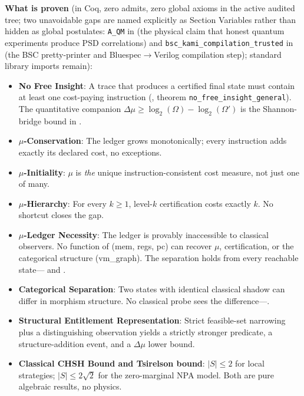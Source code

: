 \documentclass[9pt, a4paper, oneside, twocolumn]{extreport}
\theoremstyle{plain}
\theoremstyle{definition}
\theoremstyle{remark}
\begin{document}
\textbf{What is proven} (in Coq, zero admits, zero global axioms in the active audited tree; two unavoidable gaps are named explicitly as Section Variables rather than hidden as global postulates: \texttt{A\_QM} in  (the physical claim that honest quantum experiments produce PSD correlations) and \texttt{bsc\_kami\_compilation\_trusted} in  (the BSC pretty-printer and Bluespec$\to$Verilog compilation step); standard library imports remain):
\begin{itemize}
    \item \textbf{No Free Insight}: A trace that produces a certified final state must contain at least one cost-paying instruction (, theorem \texttt{no\_free\_insight\_general}). The quantitative companion $\Delta\mu \ge \log_2(\Omega) - \log_2(\Omega')$ is the Shannon-bridge bound in .
    \item \textbf{$\mu$-Conservation}: The ledger grows monotonically; every instruction adds exactly its declared cost, no exceptions.
    \item \textbf{$\mu$-Initiality}: $\mu$ is \textit{the} unique instruction-consistent cost measure, not just one of many.
    \item \textbf{$\mu$-Hierarchy}: For every $k \ge 1$, level-$k$ certification costs exactly $k$. No shortcut closes the gap.
    \item \textbf{$\mu$-Ledger Necessity}: The ledger is provably inaccessible to classical observers. No function of (mem, regs, pc) can recover $\mu$, certification, or the categorical structure (vm\_graph). The separation holds from every reachable state--- and .
    \item \textbf{Categorical Separation}: Two states with identical classical shadow can differ in morphism structure. No classical probe sees the difference---.
    \item \textbf{Structural Entitlement Representation}: Strict feasible-set narrowing plus a distinguishing observation yields a strictly stronger predicate, a structure-addition event, and a $\Delta\mu$ lower bound.
    \item \textbf{Classical CHSH Bound and Tsirelson bound}: $|S| \le 2$ for local strategies; $|S| \le 2\sqrt{2}$ for the zero-marginal NPA model. Both are pure algebraic results, no physics.

\end{itemize}
\end{document}
